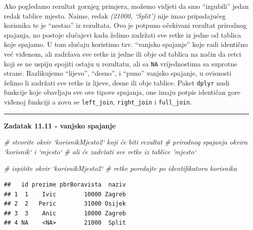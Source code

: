 \documentclass[]{book}
\newenvironment{Shaded}{\begin{snugshade}}{\end{snugshade}}
\newcommand{\KeywordTok}[1]{\textcolor[rgb]{0.13,0.29,0.53}{\textbf{#1}}}
\newcommand{\DataTypeTok}[1]{\textcolor[rgb]{0.13,0.29,0.53}{#1}}
\newcommand{\StringTok}[1]{\textcolor[rgb]{0.31,0.60,0.02}{#1}}
\newcommand{\CommentTok}[1]{\textcolor[rgb]{0.56,0.35,0.01}{\textit{#1}}}
\newcommand{\OperatorTok}[1]{\textcolor[rgb]{0.81,0.36,0.00}{\textbf{#1}}}
\newcommand{\NormalTok}[1]{#1}
\theoremstyle{definition}
\theoremstyle{definition}
\theoremstyle{definition}
\theoremstyle{remark}
\begin{document}
Ako pogledamo rezultat gornjeg primjera, možemo vidjeti da smo
``izgubili'' jedan redak tablice mjesto. Naime, redak \emph{(21000,
`Split')} nije imao pripadajućeg korisnika te je ``nestao'' iz
rezultata. Ovo je potpuno očekivani rezultat prirodnog spajanja, no
postoje slučajevi kada želimo zadržati sve retke iz jedne od tablica
koje spajamo. U tom slučaju koristimo tzv. ``vanjsko spajanje'' koje
radi identično već viđenom, ali zadržava sve retke iz jedne ili obje od
tablica na način da retci koji se ne uspiju spojiti ostaju u rezultatu,
ali sa \texttt{NA} vrijednostima sa suprotne strane. Razlikujemo
``lijevo'', ``desno'', i ``puno'' vanjsko spajanje, u ovisnosti želimo
li zadržati sve retke iz lijeve, desne ili obje tablice. Paket
\texttt{dplyr} nudi funkcije koje obavljaju sve ove tipove spajanja, one
imaju potpis identičan gore viđenoj funkciji a zovu se
\texttt{left\_join}, \texttt{right\_join} i \texttt{full\_join}.

\begin{center}\rule{0.5\linewidth}{\linethickness}\end{center}

\textbf{Zadatak 11.11 - vanjsko spajanje}

\begin{Shaded}
\begin{Highlighting}[]
\CommentTok{# stvorite okvir `korisnikMjesto2` koji će biti rezultat}
\CommentTok{# prirodnog spajanja okvira `korisnik` i `mjesto`}
\CommentTok{# ali će zadržati sve retke iz tablice 'mjesto`}

\CommentTok{# ispišite okvir `korisnikMjesto2`}
\CommentTok{# retke poredajte po identifikatoru korisnika}
\end{Highlighting}
\end{Shaded}

\begin{Shaded}
\end{Shaded}

\begin{verbatim}
##   id prezime pbrBoravista  naziv
## 1  1    Ivic        10000 Zagreb
## 2  2   Peric        31000 Osijek
## 3  3    Anic        10000 Zagreb
## 4 NA    <NA>        21000  Split
\end{verbatim}
\end{document}
